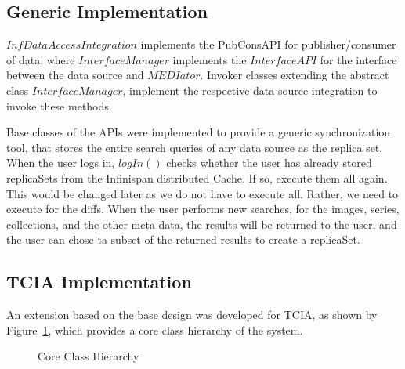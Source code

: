 \documentclass[conference]{IEEEtran}
\begin{document}
\subsection{Generic Implementation}
$InfDataAccessIntegration$ implements the PubConsAPI for publisher/consumer of data, where $InterfaceManager$ implements the $InterfaceAPI$ for the interface between the data source and $MEDIator$. Invoker classes extending the abstract class $InterfaceManager$, implement the respective data source integration to invoke these methods. 

Base classes of the APIs were implemented to provide a generic synchronization tool, that stores the entire search queries of any data source as the replica set. When the user logs in, $logIn()$ checks whether the user has already stored replicaSets from the Infinispan distributed Cache. If so, execute them all again. This would be changed later as we do not have to execute all. Rather, we need to execute for the diffs. When the user performs new searches, for the images, series, collections, and the other meta data, the results will be returned to the user, and the user can chose ta subset of the returned results to create a replicaSet.


\subsection{TCIA Implementation}
An extension based on the base design was developed for TCIA, as shown by Figure~\ref{fig:class}, which provides a core class hierarchy of the system.
\begin{figure}[b]
\begin{center}
\end{center}
 \caption{Core Class Hierarchy}
 \label{fig:class}
\end{figure}
\end{document}
